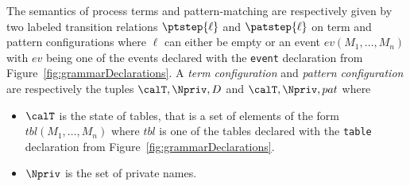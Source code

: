 \documentclass{book}
\begin{document}
The semantics of process terms and pattern-matching are respectively given by two labeled transition relations $\ptstep{\ell}$ and $\patstep{\ell}$ on term and pattern configurations where $\ell$ can either be empty or an event $ev(M_1,\ldots,M_n)$ with $ev$ being one of the events declared with the \texttt{event} declaration from Figure~\ref{fig:grammarDeclarations}. A \emph{term configuration} and \emph{pattern configuration} are respectively the tuples $\calT,\Npriv,D$ and $\calT,\Npriv,pat$ where
\begin{itemize}
	\item $\calT$ is the state of tables, that is a set of elements of the form $tbl(M_1,\ldots,M_n)$ where $tbl$ is one of the tables declared with the \texttt{table} declaration from Figure~\ref{fig:grammarDeclarations}.
	\item $\Npriv$ is the set of private names.
\end{itemize}
\end{document}
